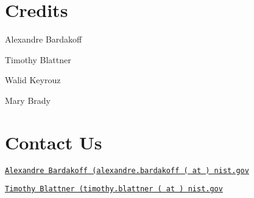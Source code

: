 \section*{Credits}

Alexandre Bardakoff

Timothy Blattner

Walid Keyrouz

Mary Brady

\section*{Contact Us}

\href{mailto:alexandre.bardakoff@nist.gov}{\tt Alexandre Bardakoff (alexandre.\+bardakoff ( at ) nist.\+gov}

\href{mailto:timothy.blattner@nist.gov}{\tt Timothy Blattner (timothy.\+blattner ( at ) nist.\+gov} 